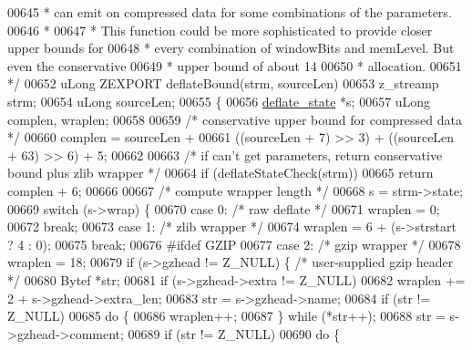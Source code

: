 \begin{DoxyCode}
00645 \textcolor{comment}{ * can emit on compressed data for some combinations of the parameters.}
00646 \textcolor{comment}{ *}
00647 \textcolor{comment}{ * This function could be more sophisticated to provide closer upper bounds for}
00648 \textcolor{comment}{ * every combination of windowBits and memLevel.  But even the conservative}
00649 \textcolor{comment}{ * upper bound of about 14%
00650 \textcolor{comment}{ * allocation.}
00651 \textcolor{comment}{ */}
00652 uLong ZEXPORT deflateBound(strm, sourceLen)
00653     z\_streamp strm;
00654     uLong sourceLen;
00655 \{
00656     \hyperlink{structinternal__state}{deflate\_state} *s;
00657     uLong complen, wraplen;
00658 
00659     \textcolor{comment}{/* conservative upper bound for compressed data */}
00660     complen = sourceLen +
00661               ((sourceLen + 7) >> 3) + ((sourceLen + 63) >> 6) + 5;
00662 
00663     \textcolor{comment}{/* if can't get parameters, return conservative bound plus zlib wrapper */}
00664     \textcolor{keywordflow}{if} (deflateStateCheck(strm))
00665         \textcolor{keywordflow}{return} complen + 6;
00666 
00667     \textcolor{comment}{/* compute wrapper length */}
00668     s = strm->state;
00669     \textcolor{keywordflow}{switch} (s->wrap) \{
00670     \textcolor{keywordflow}{case} 0:                                 \textcolor{comment}{/* raw deflate */}
00671         wraplen = 0;
00672         \textcolor{keywordflow}{break};
00673     \textcolor{keywordflow}{case} 1:                                 \textcolor{comment}{/* zlib wrapper */}
00674         wraplen = 6 + (s->strstart ? 4 : 0);
00675         \textcolor{keywordflow}{break};
00676 \textcolor{preprocessor}{#ifdef GZIP}
00677     \textcolor{keywordflow}{case} 2:                                 \textcolor{comment}{/* gzip wrapper */}
00678         wraplen = 18;
00679         \textcolor{keywordflow}{if} (s->gzhead != Z\_NULL) \{          \textcolor{comment}{/* user-supplied gzip header */}
00680             Bytef *str;
00681             \textcolor{keywordflow}{if} (s->gzhead->extra != Z\_NULL)
00682                 wraplen += 2 + s->gzhead->extra\_len;
00683             str = s->gzhead->name;
00684             \textcolor{keywordflow}{if} (str != Z\_NULL)
00685                 \textcolor{keywordflow}{do} \{
00686                     wraplen++;
00687                 \} \textcolor{keywordflow}{while} (*str++);
00688             str = s->gzhead->comment;
00689             \textcolor{keywordflow}{if} (str != Z\_NULL)
00690                 \textcolor{keywordflow}{do} \{
}
\end{DoxyCode}

